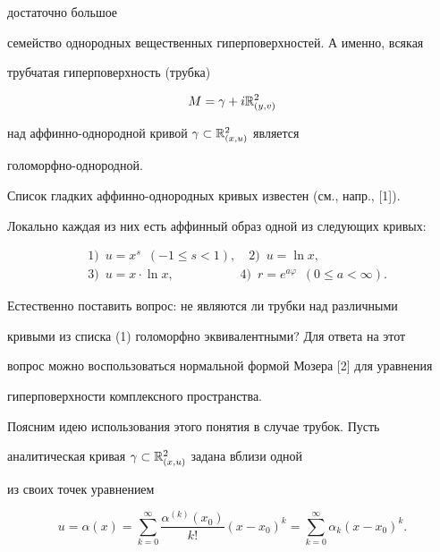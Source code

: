 достаточно большое 


семейство однородных вещественных гиперповерхностей. А именно, всякая 


трубчатая гиперповерхность (трубка) 


$$ 


M=\gamma +i\Bbb R^2_{(y,v)} 


$$ 


над аффинно-однородной кривой $\gamma\subset\Bbb R^2_{(x,u)}$ является 


голоморфно-однородной. 


 


Список гладких аффинно-однородных кривых известен (см., напр., [1]). 


Локально каждая из них есть аффинный образ одной из следующих кривых: 


\begin{equation}


\begin{split}


&1) \ \; u=x^s \ \; (-1\le s<1), \quad 2) \ \; u=\ln x,\\ 


&3) \ \; u=x\cdot\ln x, \qquad\qquad\quad\; 4) \ \; r=e^{a\varphi} \ \; 


(0\le a<\infty). 


\end{split}


\end{equation} 


 


Естественно поставить вопрос: не являются ли трубки над различными 


кривыми из списка (1) голоморфно эквивалентными? Для ответа на этот 


вопрос можно воспользоваться нормальной формой Мозера [2] для уравнения 


гиперповерхности комплексного пространства. 


 


Поясним идею использования этого понятия в случае трубок. Пусть 


аналитическая кривая $\gamma\subset\Bbb R^2_{(x,u)}$ задана вблизи одной 


из своих точек уравнением 


\begin{equation} 


u=\alpha(x)=\sum^\infty_{k=0} 


\frac{\alpha^{(k)}(x_0)}{k!}(x-x_0)^k=\sum^\infty_{k=0} 


\alpha_k(x-x_0)^k. 


\end{equation} 


